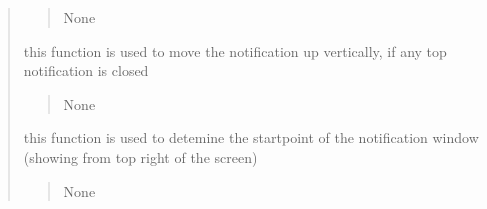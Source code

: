 \documentclass[letterpaper,10pt,english]{sphinxmanual}
\begin{document}
\begin{quote}
\begin{savenotes}
\begin{fulllineitems}
\begin{savenotes}
\begin{fulllineitems}
\begin{quote}
\begin{description}
\sphinxAtStartPar
None

\end{description}\end{quote}

\end{fulllineitems}\end{savenotes}


\begin{savenotes}\begin{fulllineitems}
\label{\detokenize{setting/notif_UI:oxin.notif_UI.UI_main_window.win_move_top}}
\pysigstartsignatures
{}
\pysigstopsignatures
\sphinxAtStartPar
this function is used to move the notification up vertically, if any top notification is closed
\begin{quote}\begin{description}
\sphinxAtStartPar
None

\end{description}\end{quote}

\end{fulllineitems}\end{savenotes}


\begin{savenotes}\begin{fulllineitems}
\label{\detokenize{setting/notif_UI:oxin.notif_UI.UI_main_window.win_startpoint}}
\pysigstartsignatures
{}
\pysigstopsignatures
\sphinxAtStartPar
this function is used to detemine the startpoint of the notification window (showing from top right of the screen)
\begin{quote}\begin{description}
\sphinxAtStartPar
None

\end{description}\end{quote}

\end{fulllineitems}\end{savenotes}



\end{fulllineitems}
\end{savenotes}
\end{quote}
\end{document}
